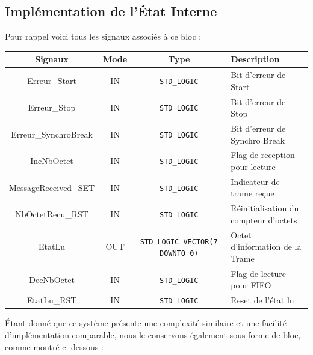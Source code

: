 \subsection{Implémentation de l’État Interne}

Pour rappel voici tous les signaux associés à ce bloc : 
\newline

\begin{center}
\renewcommand{\arraystretch}{1.2} %
\small %
    \begin{tabularx}{\textwidth}{|c||c|c|X|}
     \hline				
       \textbf{Signaux} & \textbf{Mode} & \textbf{Type} & \textbf{Description}  \\ \hline 
       Erreur\_Start & IN & \texttt{STD\_LOGIC} & Bit d’erreur de Start \\
       Erreur\_Stop & IN & \texttt{STD\_LOGIC} & Bit d’erreur de Stop\\
       Erreur\_SynchroBreak & IN & \texttt{STD\_LOGIC} & Bit d’erreur de Synchro Break\\
       IncNbOctet & IN & \texttt{STD\_LOGIC} & Flag de reception pour lecture \\
       MessageReceived\_SET & IN & \texttt{STD\_LOGIC} & Indicateur de trame reçue \\
       NbOctetRecu\_RST & IN & \texttt{STD\_LOGIC} & Réinitialisation du compteur d’octets \\
       EtatLu & OUT & \texttt{STD\_LOGIC\_VECTOR(7 DOWNTO 0)} & Octet d'information de la Trame \\
       DecNbOctet & IN & \texttt{STD\_LOGIC} & Flag de lecture pour FIFO \\
       EtatLu\_RST & IN & \texttt{STD\_LOGIC} & Reset de l'état lu \\
     \hline  
    \end{tabularx}
\end{center}

Étant donné que ce système présente une complexité similaire et une facilité d’implémentation comparable, nous le conservons également sous forme de bloc, comme montré ci-dessous : 
\newline

